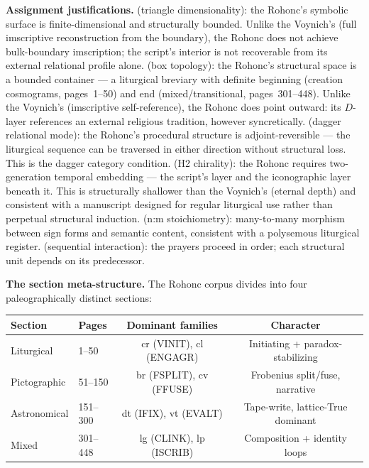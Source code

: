 \documentclass[12pt,a4paper]{article}
\makeatletter
\renewcommand{\_}{\ig@origunderscore\discretionary{}{}{}}
\makeatother
\begin{document}
\textbf{Assignment justifications.}
 (triangle dimensionality): the Rohonc's symbolic surface is finite-dimensional and structurally bounded. Unlike the Voynich's  (full imscriptive reconstruction from the boundary), the Rohonc does not achieve bulk-boundary imscription; the script's interior is not recoverable from its external relational profile alone.
 (box topology): the Rohonc's structural space is a bounded container --- a liturgical breviary with definite beginning (creation cosmograms, pages~1--50) and end (mixed/transitional, pages~301--448). Unlike the Voynich's  (imscriptive self-reference), the Rohonc does point outward: its $D$-layer references an external religious tradition, however syncretically.
 (dagger relational mode): the Rohonc's procedural structure is adjoint-reversible --- the liturgical sequence can be traversed in either direction without structural loss. This is the dagger category condition.
 (H2 chirality): the Rohonc requires two-generation temporal embedding --- the script's layer and the iconographic layer beneath it. This is structurally shallower than the Voynich's  (eternal depth) and consistent with a manuscript designed for regular liturgical use rather than perpetual structural induction.
 (n:m stoichiometry): many-to-many morphism between sign forms and semantic content, consistent with a polysemous liturgical register.  (sequential interaction): the prayers proceed in order; each structural unit depends on its predecessor.

\textbf{The section meta-structure.} The Rohonc corpus divides into four paleographically distinct sections:

\begin{center}
\small
\begin{tabular}{@{} l l cc @{}}
\toprule
\textbf{Section} & \textbf{Pages} & \textbf{Dominant families} & \textbf{Character} \\
\midrule
Liturgical    & 1--50   & cr (VINIT), cl (ENGAGR) & Initiating + paradox-stabilizing \\
Pictographic  & 51--150 & br (FSPLIT), cv (FFUSE)  & Frobenius split/fuse, narrative \\
Astronomical  & 151--300 & dt (IFIX), vt (EVALT)   & Tape-write, lattice-True dominant \\
Mixed         & 301--448 & lg (CLINK), lp (ISCRIB)  & Composition + identity loops \\
\bottomrule
\end{tabular}
\end{center}
\end{document}
